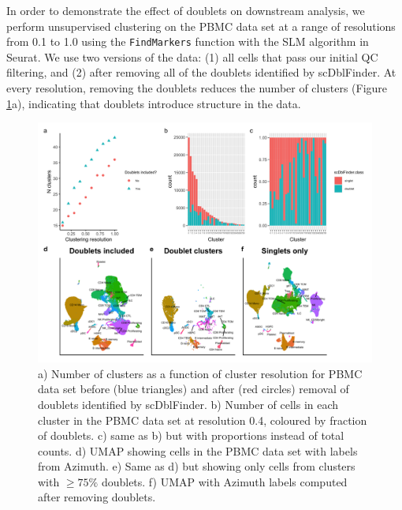 \documentclass[unnumsec,webpdf,modern,large]{oup-authoring-template}
\begin{document}
	In order to demonstrate the effect of doublets on downstream analysis, we perform unsupervised clustering on the PBMC data set at a range of resolutions from 0.1 to 1.0 using the \texttt{FindMarkers} function with the SLM algorithm in Seurat.
	We use two versions of the data: (1) all cells that pass our initial QC filtering, and (2) after removing all of the doublets identified by scDblFinder. 
	At every resolution, removing the doublets reduces the number of clusters (Figure \ref{fig:doublet_clusters}a), indicating that doublets introduce structure in the data. 
	\begin{figure}
		\begin{center}
			\includegraphics[scale=0.15]{figures/doublet_QC.png} 
			\caption{ 
				a) Number of clusters as a function of cluster resolution for PBMC data set before (blue triangles) and after (red circles) removal of doublets identified by scDblFinder. 
				b) Number of cells in each cluster in the PBMC data set at resolution 0.4, coloured by fraction of doublets. 
				c) same as b) but with proportions instead of total counts. 
				d) UMAP showing cells in the PBMC data set with labels from Azimuth. 
				e) Same as d) but showing only cells from clusters with $\geq 75\%$ doublets. 
				f) UMAP with Azimuth labels computed after removing doublets.
				}
			\label{fig:doublet_clusters}
		\end{center}	
	\end{figure} 
		
\end{document}

